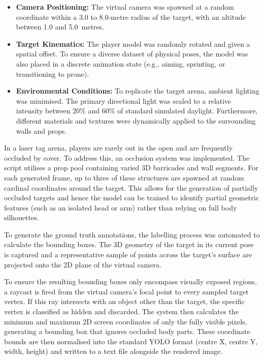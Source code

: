 \documentclass{report_template_oxford}
\begin{document}
\begin{itemize}
    \item \textbf{Camera Positioning:} The virtual camera was spawned at a random coordinate within a 3.0 to 8.0-metre radius of the target, with an altitude between 1.0 and 5.0~metres.
    \item \textbf{Target Kinematics:} The player model was randomly rotated and given a spatial offset. To ensure a diverse dataset of physical poses, the model was also placed in a discrete animation state (e.g., aiming, sprinting, or transitioning to prone).
    \item \textbf{Environmental Conditions:} To replicate the target arena, ambient lighting was minimised. The primary directional light was scaled to a relative intensity between 20\% and 60\% of standard simulated daylight. Furthermore, different materials and textures were dynamically applied to the surrounding walls and props.
\end{itemize}

In a laser tag arena, players are rarely out in the open and are frequently occluded by cover. To address this, an occlusion system was implemented. The script utilises a prop pool containing varied 3D barricades and wall segments. For each generated frame, up to three of these structures are spawned at random cardinal coordinates around the target. This allows for the generation of partially occluded targets and hence the model can be trained to identify partial geometric features (such as an isolated head or arm) rather than relying on full body silhouettes.

To generate the ground truth annotations, the labelling process was automated to calculate the bounding boxes. The 3D geometry of the target in its current pose is captured and a representative sample of points across the target's surface are projected onto the 2D plane of the virtual camera. 

To ensure the resulting bounding boxes only encompass visually exposed regions, a raycast is fired from the virtual camera's focal point to every sampled target vertex. If this ray intersects with an object other than the target, the specific vertex is classified as hidden and discarded. The system then calculates the minimum and maximum 2D screen coordinates of only the fully visible pixels, generating a bounding box that ignores occluded body parts. These coordinate bounds are then normalised into the standard YOLO format (centre X, centre Y, width, height) and written to a text file alongside the rendered image. 
\end{document}
